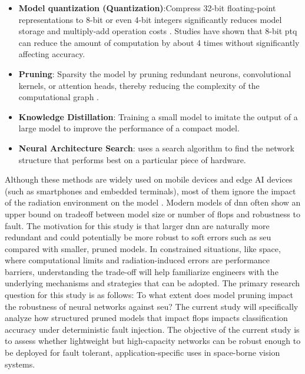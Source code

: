\begin{itemize}

  \item \textbf{Model quantization (Quantization)}:Compress 32-bit floating-point representations to 8-bit or even 4-bit integers significantly reduces model storage and multiply-add operation costs \cite{howard2017mobilenet}. Studies have shown that 8-bit \gls{ptq} can reduce the amount of computation by about 4 times without significantly affecting accuracy.

  \item \textbf{Pruning}: Sparsity the model by pruning redundant neurons, convolutional kernels, or attention heads, thereby reducing the complexity of the computational graph \cite{raina2009large}.

  \item \textbf{Knowledge Distillation}: Training a small model to imitate the output of a large model to improve the performance of a compact model.

  \item \textbf{Neural Architecture Search}: uses a search algorithm to find the network structure that performs best on a particular piece of hardware.

\end{itemize}



Although these methods are widely used on mobile devices and edge AI devices (such as smartphones and embedded terminals), most of them ignore the impact of the radiation environment on the model \cite{Souvatzoglou2024}.
Modern models of \gls{dnn} often show an upper bound on tradeoff between model size or number of \gls{flops} and robustness to fault. The motivation for this study is that larger \gls{dnn} are naturally more redundant and could potentially be more robust to soft errors such as \gls{seu} compared with smaller, pruned models. In constrained situations, like space, where computational limits and radiation-induced errors are performance barriers, understanding the trade-off will help familiarize engineers with the underlying mechanisms and strategies that can be adopted.
The primary research question for this study is as follows: To what extent does model pruning impact the robustness of neural networks against \gls{seu}? The current study will specifically analyze how structured pruned models that impact \gls{flops} impacts classification accuracy under deterministic fault injection. The objective of the current study is to assess whether lightweight but high-capacity networks can be robust enough to be deployed for fault tolerant, application-specific uses in space-borne vision systems.



